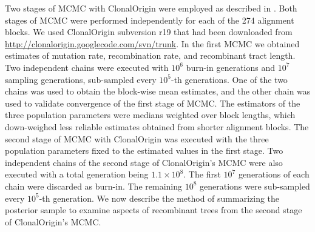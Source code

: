 \documentclass[english]{article}
\begin{document}
Two stages of MCMC with ClonalOrigin
were employed as described in \citet{Didelot2010}. 
Both stages of MCMC were performed independently for each of the 274 alignment blocks. 
We used ClonalOrigin subversion r19 that had been downloaded from 
\url{http://clonalorigin.googlecode.com/svn/trunk}. 
In the first MCMC we obtained estimates of 
mutation rate, recombination rate, and recombinant tract length. 
Two independent chains were executed with $10^6$ burn-in generations and $10^7$ 
sampling generations, sub-sampled every $10^5$-th generations. One of the two chains
was used to obtain the block-wise mean estimates, and the other chain was used 
to validate convergence of the first stage of MCMC. 
The estimators of the three population parameters were medians weighted over
block lengths, which down-weighed less reliable estimates obtained from shorter
alignment blocks. 
The second stage of MCMC with ClonalOrigin was executed with the three population
parameters fixed to the estimated values in the first stage. 
Two independent chains of the second stage
of ClonalOrigin's MCMC were also executed with a total generation being
$1.1\times10^8$. The first $10^7$ generations of each chain were discarded
as burn-in. The remaining $10^8$ generations were sub-sampled
every $10^5$-th generation.
We now describe the method of summarizing
the posterior sample to examine aspects of recombinant trees from the second
stage of ClonalOrigin's MCMC. 
\end{document}
